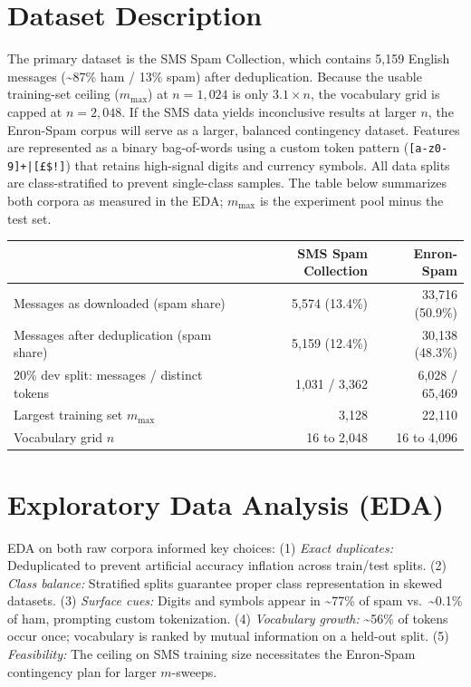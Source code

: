 \documentclass[11pt]{article}
\newcommand{\tokpattern}{\texttt{[a-z0-9]+|[\pounds\$\texteuro!]}}
\begin{document}
\section{Dataset Description}

The primary dataset is the SMS Spam Collection, which contains 5,159 English messages (\textasciitilde 87\% ham / 13\% spam) after deduplication. Because the usable training-set ceiling ($m_{\text{max}}$) at $n = 1{,}024$ is only $3.1 \times n$, the vocabulary grid is capped at $n = 2{,}048$. If the SMS data yields inconclusive results at larger $n$, the Enron-Spam corpus will serve as a larger, balanced contingency dataset. Features are represented as a binary bag-of-words using a custom token pattern (\tokpattern) that retains high-signal digits and currency symbols. All data splits are class-stratified to prevent single-class samples. The table below summarizes both corpora as measured in the EDA; $m_{\text{max}}$ is the experiment pool minus the test set.

\begin{center}
\small
\begin{tabular}{@{}lrr@{}}
\toprule
 & \textbf{SMS Spam Collection} & \textbf{Enron-Spam} \\
\midrule
Messages as downloaded (spam share) & 5,574 (13.4\%) & 33,716 (50.9\%) \\
Messages after deduplication (spam share) & 5,159 (12.4\%) & 30,138 (48.3\%) \\
20\% dev split: messages / distinct tokens & 1,031 / 3,362 & 6,028 / 65,469 \\
Largest training set $m_{\text{max}}$ & 3,128 & 22,110 \\
Vocabulary grid $n$ & 16 to 2,048 & 16 to 4,096 \\
\bottomrule
\end{tabular}
\end{center}

\section{Exploratory Data Analysis (EDA)}

EDA on both raw corpora informed key choices: (1) \textit{Exact duplicates:} Deduplicated to prevent artificial accuracy inflation across train/test splits. (2) \textit{Class balance:} Stratified splits guarantee proper class representation in skewed datasets. (3) \textit{Surface cues:} Digits and symbols appear in \textasciitilde 77\% of spam vs.\ \textasciitilde 0.1\% of ham, prompting custom tokenization. (4) \textit{Vocabulary growth:} \textasciitilde 56\% of tokens occur once; vocabulary is ranked by mutual information on a held-out split. (5) \textit{Feasibility:} The ceiling on SMS training size necessitates the Enron-Spam contingency plan for larger $m$-sweeps.
\end{document}
